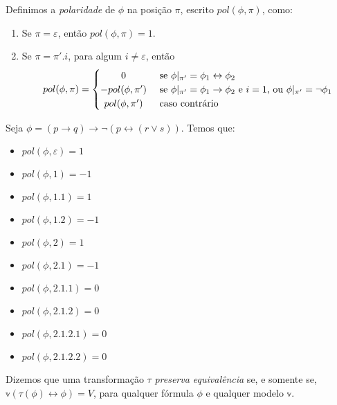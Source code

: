 \begin{definition}
    Definimos a \emph{polaridade} de $\phi$ na posição $\pi$, escrito $pol(\phi,\pi)$, como:
    \begin{enumerate}
        \item Se $\pi = \varepsilon$, então $pol(\phi,\pi) = 1$.
        \item Se $\pi = \pi'.i$, para algum $i \neq \varepsilon$, então
            \[
                pol(\phi,\pi) =
                \begin{cases}
                    \hfill               0  \hfill & \text{ se $\phi|_{\pi'} = \phi_1 \leftrightarrow \phi_2$} \\
                    \hfill -pol(\phi,\pi')  \hfill & \text{ se $\phi|_{\pi'} = \phi_1 \rightarrow \phi_2$ e $i=1$, ou $\phi|_{\pi'} = \neg \phi_1$} \\
                    \hfill  pol(\phi,\pi')  \hfill & \text{ caso contrário} \\
                \end{cases}
            \]
    \end{enumerate}
\end{definition}

\begin{example}
    Seja $\phi = (p \rightarrow q) \rightarrow \neg(p \leftrightarrow (r \vee s))$. Temos que:
    \begin{itemize}
        \item $pol(\phi,\varepsilon) = 1$
        \item $pol(\phi,1) = -1$
        \item $pol(\phi,1.1) = 1$
        \item $pol(\phi,1.2) = -1$
        \item $pol(\phi,2) = 1$
        \item $pol(\phi,2.1) = -1$
        \item $pol(\phi,2.1.1) = 0$
        \item $pol(\phi,2.1.2) = 0$
        \item $pol(\phi,2.1.2.1) = 0$
        \item $pol(\phi,2.1.2.2) = 0$
    \end{itemize}
\end{example}

\begin{definition}
    Dizemos que uma transformação $\tau$ \emph{preserva equivalência} se, e somente se, $\mathbb{v}(\tau(\phi) \leftrightarrow \phi) = V$, para qualquer fórmula $\phi$ e qualquer modelo $\mathbb{v}$.
\end{definition}

